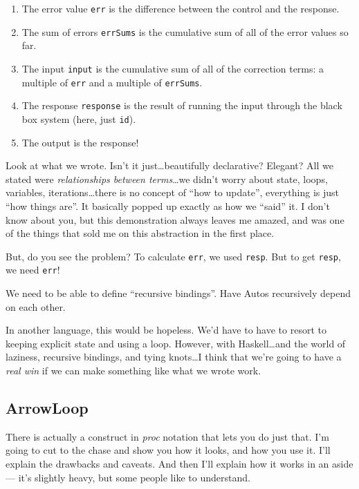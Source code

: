 \documentclass[]{article}
\begin{document}
\begin{enumerate}
\def\labelenumi{\arabic{enumi}.}
\tightlist
\item
  The error value \texttt{err} is the difference between the control and
  the response.
\item
  The sum of errors \texttt{errSums} is the cumulative sum of all of the
  error values so far.
\item
  The input \texttt{input} is the cumulative sum of all of the
  correction terms: a multiple of \texttt{err} and a multiple of
  \texttt{errSums}.
\item
  The response \texttt{response} is the result of running the input
  through the black box system (here, just \texttt{id}).
\item
  The output is the response!
\end{enumerate}

Look at what we wrote. Isn't it just\ldots{}beautifully declarative?
Elegant? All we stated were \emph{relationships between terms}\ldots{}we
didn't worry about state, loops, variables, iterations\ldots{}there is
no concept of ``how to update'', everything is just ``how things are''.
It basically popped up exactly as how we ``said'' it. I don't know about
you, but this demonstration always leaves me amazed, and was one of the
things that sold me on this abstraction in the first place.

But, do you see the problem? To calculate \texttt{err}, we used
\texttt{resp}. But to get \texttt{resp}, we need \texttt{err}!

We need to be able to define ``recursive bindings''. Have Autos
recursively depend on each other.

In another language, this would be hopeless. We'd have to have to resort
to keeping explicit state and using a loop. However, with
Haskell\ldots{}and the world of laziness, recursive bindings, and tying
knots\ldots{}I think that we're going to have a \emph{real win} if we
can make something like what we wrote work.

\subsection{ArrowLoop}\label{arrowloop}

There is actually a construct in \emph{proc} notation that lets you do
just that. I'm going to cut to the chase and show you how it looks, and
how you use it. I'll explain the drawbacks and caveats. And then I'll
explain how it works in an aside --- it's slightly heavy, but some
people like to understand.
\end{document}
